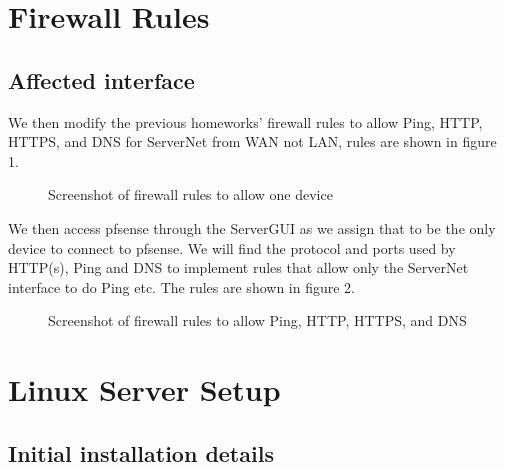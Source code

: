 \documentclass{article}
\makeatletter
\newcommand*{\currentname}{\@currentlabelname}
\makeatother
\begin{document}
\pagestyle{fancy}
\fancyhf{}
\fancyhead[L]{Page ends at \currentname}
\renewcommand{\headrulewidth}{1pt}

\renewcommand*\contentsname{Table of Contents}
\tableofcontents
\renewcommand{\listfigurename}{Illustrations}
\listoffigures
\newpage

\section{Firewall Rules}
\label{sec:Firewall RulesID}

	\FloatBarrier
	\subsection{Affected interface}
	\label{subsec:Affected interfaceID}

	We then modify the previous homeworks' firewall rules to allow Ping, HTTP, HTTPS, and DNS for ServerNet from WAN not LAN, rules are shown in figure 1.

		\FloatBarrier
		\begin{figure}[h!]
			\centering
			\caption{Screenshot of firewall rules to allow one device}
		\end{figure}
		\FloatBarrier


	We then access pfsense through the ServerGUI as we assign that to be the only device to connect to pfsense. We will find the protocol and ports used by HTTP(s), Ping and DNS to implement rules that allow only the ServerNet interface to do Ping etc. The rules are shown in figure 2.

		\FloatBarrier
		\begin{figure}[h!]
			\centering
			\caption{Screenshot of firewall rules to allow Ping, HTTP, HTTPS, and DNS}
		\end{figure}
		\FloatBarrier


\section{Linux Server Setup}
\label{sec:Linux Server SetupID}

	\FloatBarrier
	\subsection{Initial installation details}
	\label{subsec:Initial installation detailsID}
\end{document}
